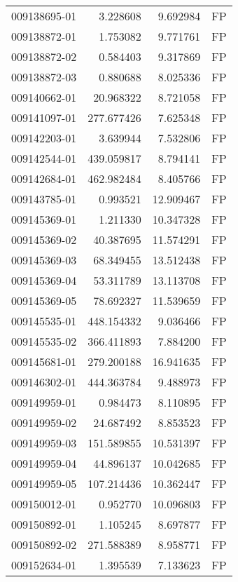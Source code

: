 \begin{tabular}{lrrl}
009138695-01 &    3.228608 &       9.692984 &   FP \\
009138872-01 &    1.753082 &       9.771761 &   FP \\
009138872-02 &    0.584403 &       9.317869 &   FP \\
009138872-03 &    0.880688 &       8.025336 &   FP \\
009140662-01 &   20.968322 &       8.721058 &   FP \\
009141097-01 &  277.677426 &       7.625348 &   FP \\
009142203-01 &    3.639944 &       7.532806 &   FP \\
009142544-01 &  439.059817 &       8.794141 &   FP \\
009142684-01 &  462.982484 &       8.405766 &   FP \\
009143785-01 &    0.993521 &      12.909467 &   FP \\
009145369-01 &    1.211330 &      10.347328 &   FP \\
009145369-02 &   40.387695 &      11.574291 &   FP \\
009145369-03 &   68.349455 &      13.512438 &   FP \\
009145369-04 &   53.311789 &      13.113708 &   FP \\
009145369-05 &   78.692327 &      11.539659 &   FP \\
009145535-01 &  448.154332 &       9.036466 &   FP \\
009145535-02 &  366.411893 &       7.884200 &   FP \\
009145681-01 &  279.200188 &      16.941635 &   FP \\
009146302-01 &  444.363784 &       9.488973 &   FP \\
009149959-01 &    0.984473 &       8.110895 &   FP \\
009149959-02 &   24.687492 &       8.853523 &   FP \\
009149959-03 &  151.589855 &      10.531397 &   FP \\
009149959-04 &   44.896137 &      10.042685 &   FP \\
009149959-05 &  107.214436 &      10.362447 &   FP \\
009150012-01 &    0.952770 &      10.096803 &   FP \\
009150892-01 &    1.105245 &       8.697877 &   FP \\
009150892-02 &  271.588389 &       8.958771 &   FP \\
009152634-01 &    1.395539 &       7.133623 &   FP \\

\end{tabular}
